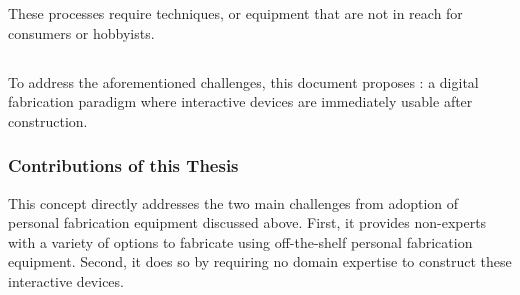          These processes require techniques, or equipment that are not in reach
          for consumers or hobbyists.
      
    \subsection{\papf}
      To address the aforementioned challenges, this document proposes \papf:
      a digital fabrication paradigm where interactive devices are
      immediately usable after construction.

      \subsubsection{Contributions of this Thesis}
        This concept directly addresses the two main challenges from adoption of
        personal fabrication equipment discussed above. First, it provides
        non-experts with a variety of options to fabricate using off-the-shelf
        personal fabrication equipment. Second, it does so by requiring no domain
        expertise to construct these interactive devices.